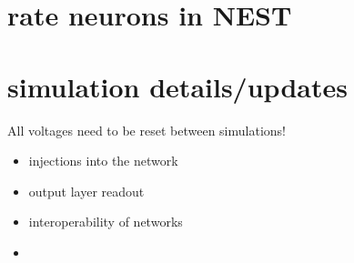 \section{rate neurons in NEST}

\section{simulation details/updates}

All voltages need to be reset between simulations!

\begin{itemize}
  \item injections into the network
  \item output layer readout
  \item interoperability of networks
  \item

\end{itemize}


